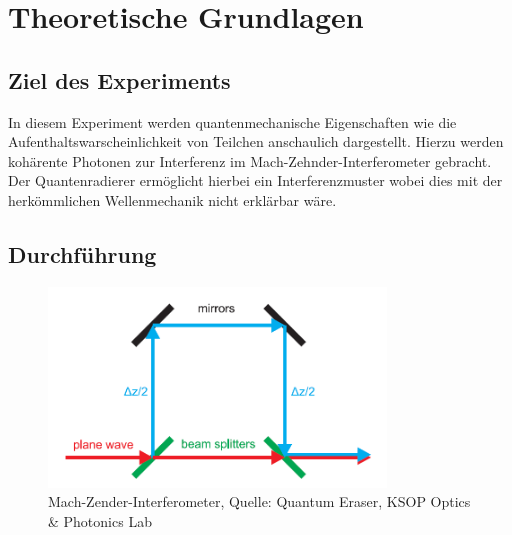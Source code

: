 \documentclass{include/thesisclass3}
\begin{document}
	\FrontMatter
	
	\tableofcontents                  
	\newpage
	\MainMatter


\chapter{Theoretische Grundlagen}

\section{Ziel des Experiments}

In diesem Experiment werden quantenmechanische Eigenschaften wie die Aufenthaltswarscheinlichkeit von Teilchen anschaulich dargestellt. Hierzu werden kohärente Photonen zur Interferenz im Mach-Zehnder-Interferometer gebracht. Der Quantenradierer ermöglicht hierbei ein Interferenzmuster wobei dies mit der herkömmlichen Wellenmechanik nicht erklärbar wäre.

\section{Durchführung}
\begin{figure}[H]
	\begin{center}
		\includegraphics[width=0.8\textwidth]{images/Beamsplit.png}
		\caption{Mach-Zender-Interferometer, Quelle: Quantum Eraser, KSOP Optics \& Photonics Lab}
		\label{Mach-Zehnder}
	\end{center}
\end{figure}
\end{document}
